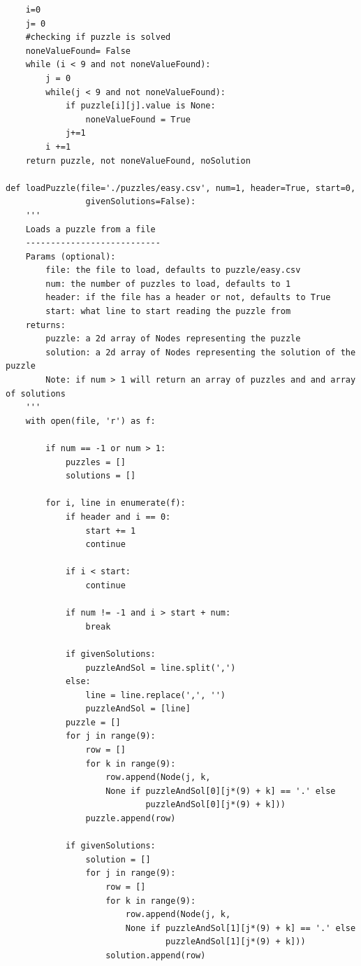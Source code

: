 \documentclass{article}
\begin{document}
\newpage
\begin{verbatim}
    i=0 
    j= 0 
    #checking if puzzle is solved
    noneValueFound= False
    while (i < 9 and not noneValueFound):
        j = 0
        while(j < 9 and not noneValueFound):
            if puzzle[i][j].value is None: 
                noneValueFound = True
            j+=1
        i +=1 
    return puzzle, not noneValueFound, noSolution

def loadPuzzle(file='./puzzles/easy.csv', num=1, header=True, start=0, 
                givenSolutions=False):
    '''
    Loads a puzzle from a file
    ---------------------------
    Params (optional):
        file: the file to load, defaults to puzzle/easy.csv
        num: the number of puzzles to load, defaults to 1
        header: if the file has a header or not, defaults to True
        start: what line to start reading the puzzle from
    returns:
        puzzle: a 2d array of Nodes representing the puzzle
        solution: a 2d array of Nodes representing the solution of the puzzle
        Note: if num > 1 will return an array of puzzles and and array of solutions
    '''
    with open(file, 'r') as f:
        
        if num == -1 or num > 1:
            puzzles = []
            solutions = []

        for i, line in enumerate(f):
            if header and i == 0:
                start += 1
                continue

            if i < start:
                continue
        
            if num != -1 and i > start + num:
                break
            
            if givenSolutions:
                puzzleAndSol = line.split(',')
            else:
                line = line.replace(',', '')
                puzzleAndSol = [line]
            puzzle = []
            for j in range(9):
                row = []
                for k in range(9):
                    row.append(Node(j, k, 
                    None if puzzleAndSol[0][j*(9) + k] == '.' else 
                            puzzleAndSol[0][j*(9) + k]))
                puzzle.append(row)

            if givenSolutions:
                solution = []
                for j in range(9):
                    row = []
                    for k in range(9):
                        row.append(Node(j, k, 
                        None if puzzleAndSol[1][j*(9) + k] == '.' else 
                                puzzleAndSol[1][j*(9) + k]))
                    solution.append(row)


\end{verbatim}
\end{document}
